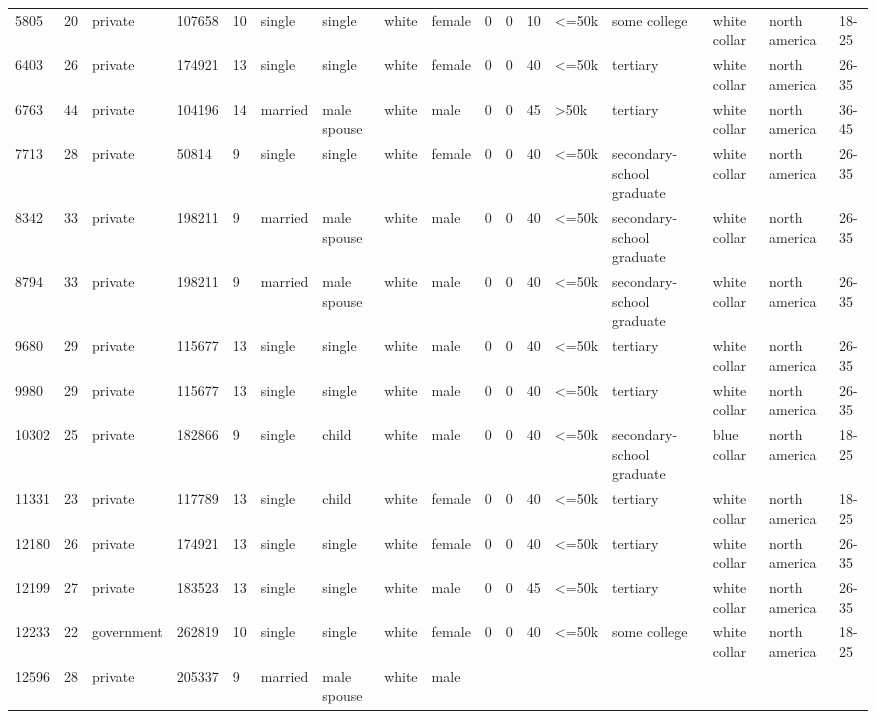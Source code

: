 \documentclass[
  letterpaper,
  DIV=11,
  numbers=noendperiod]{scrartcl}
\begin{document}
\begin{longtable}[]{@{}lllllllllllllllll@{}}
5805 & 20 & private & 107658 & 10 & single & single & white & female & 0
& 0 & 10 & \textless=50k & some college & white collar & north america &
18-25 \\
6403 & 26 & private & 174921 & 13 & single & single & white & female & 0
& 0 & 40 & \textless=50k & tertiary & white collar & north america &
26-35 \\
6763 & 44 & private & 104196 & 14 & married & male spouse & white & male
& 0 & 0 & 45 & \textgreater50k & tertiary & white collar & north america
& 36-45 \\
7713 & 28 & private & 50814 & 9 & single & single & white & female & 0 &
0 & 40 & \textless=50k & secondary-school graduate & white collar &
north america & 26-35 \\
8342 & 33 & private & 198211 & 9 & married & male spouse & white & male
& 0 & 0 & 40 & \textless=50k & secondary-school graduate & white collar
& north america & 26-35 \\
8794 & 33 & private & 198211 & 9 & married & male spouse & white & male
& 0 & 0 & 40 & \textless=50k & secondary-school graduate & white collar
& north america & 26-35 \\
9680 & 29 & private & 115677 & 13 & single & single & white & male & 0 &
0 & 40 & \textless=50k & tertiary & white collar & north america &
26-35 \\
9980 & 29 & private & 115677 & 13 & single & single & white & male & 0 &
0 & 40 & \textless=50k & tertiary & white collar & north america &
26-35 \\
10302 & 25 & private & 182866 & 9 & single & child & white & male & 0 &
0 & 40 & \textless=50k & secondary-school graduate & blue collar & north
america & 18-25 \\
11331 & 23 & private & 117789 & 13 & single & child & white & female & 0
& 0 & 40 & \textless=50k & tertiary & white collar & north america &
18-25 \\
12180 & 26 & private & 174921 & 13 & single & single & white & female &
0 & 0 & 40 & \textless=50k & tertiary & white collar & north america &
26-35 \\
12199 & 27 & private & 183523 & 13 & single & single & white & male & 0
& 0 & 45 & \textless=50k & tertiary & white collar & north america &
26-35 \\
12233 & 22 & government & 262819 & 10 & single & single & white & female
& 0 & 0 & 40 & \textless=50k & some college & white collar & north
america & 18-25 \\
12596 & 28 & private & 205337 & 9 & married & male spouse & white & male

\end{longtable}
\end{document}
